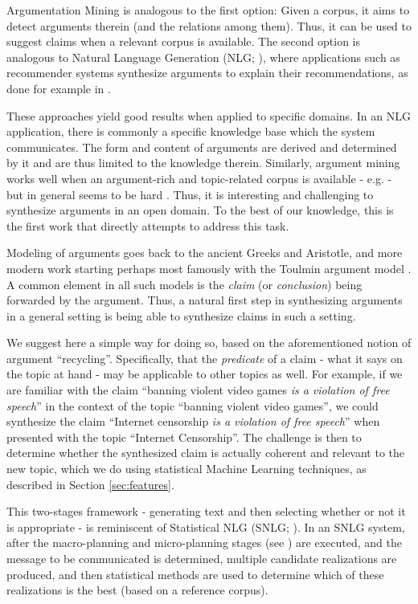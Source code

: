 \documentclass[11pt]{article}
\begin{document}
Argumentation Mining \cite{arg-mining} is analogous to the first option: Given a corpus, it aims to 
detect arguments therein (and the relations among them). Thus, it can be used to suggest %
claims when a relevant corpus is available. The second option is analogous to Natural Language Generation (NLG; \cite{nlg}), where applications such as recommender systems synthesize arguments to explain their recommendations, as done for example in \cite{Carenini06} .

These approaches yield good results when applied to specific domains. In an NLG application, there is commonly a specific knowledge base which the system communicates. The form and content of arguments are derived and determined by it and are thus limited to the knowledge therein. Similarly, argument mining works well when an argument-rich and topic-related corpus is available - e.g. \cite{arg-mining-legal} - but in general seems to be hard \cite{claim-detection}. Thus, it is interesting and challenging to synthesize arguments in an open domain. To the best of our knowledge, this is the first work that directly attempts to address this task.

Modeling of arguments goes back to the ancient Greeks and Aristotle, and more modern work starting perhaps most famously with the Toulmin argument model \cite{toulmin}. A common element in all such models is the \textit{claim} (or \textit{conclusion}) being forwarded by the argument. Thus, a natural first step in synthesizing arguments in a general setting is being able to synthesize claims in such a setting.

We suggest here a simple way for doing so, based on the aforementioned notion of argument ``recycling''. 
Specifically, that the {\it predicate\/} %
 of a claim - what it says on the topic at hand - may be applicable to other topics as well. 
For example, if we are familiar with the claim ``banning violent video games {\it is a violation of free speech\/}''  %
in the context of the topic ``banning violent video games'', we could synthesize the claim 
``Internet censorship {\it is a violation of free speech\/}'' %
when presented with the topic ``Internet Censorship''. The challenge is then to determine whether the 
synthesized %
claim is actually coherent and relevant to the new topic, which we do using statistical Machine Learning techniques, as described in Section \ref{sec:features}.

This two-stages framework - generating text and then selecting whether or not it is appropriate - is reminiscent of Statistical NLG (SNLG; \cite{snlg}). In an SNLG system, after the macro-planning and micro-planning stages (see \cite{nlg}) are executed, and the message to be communicated is determined, multiple candidate realizations are produced, and then statistical methods are used to determine which of these realizations is the best (based on a reference corpus).
\end{document}
